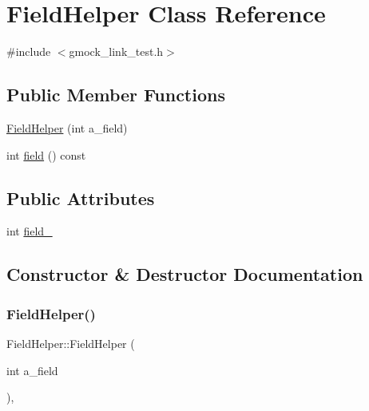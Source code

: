 \hypertarget{class_field_helper}{}\section{Field\+Helper Class Reference}
\label{class_field_helper}


{\ttfamily \#include $<$gmock\+\_\+link\+\_\+test.\+h$>$}

\subsection*{Public Member Functions}
\begin{DoxyCompactItemize}
\item 
\hyperlink{class_field_helper_a06729cbd5da2993e8007cb62f1d00b3a}{Field\+Helper} (int a\+\_\+field)
\item 
int \hyperlink{class_field_helper_af2959e142813205aeeb4d2ad27430ad3}{field} () const
\end{DoxyCompactItemize}
\subsection*{Public Attributes}
\begin{DoxyCompactItemize}
\item 
int \hyperlink{class_field_helper_a50a7ec9efc60377363d5ce8bea1708ac}{field\+\_\+}
\end{DoxyCompactItemize}


\subsection{Constructor \& Destructor Documentation}
\mbox{\label{class_field_helper_a06729cbd5da2993e8007cb62f1d00b3a}} 
\subsubsection{\texorpdfstring{Field\+Helper()}{FieldHelper()}}
{\footnotesize\ttfamily Field\+Helper\+::\+Field\+Helper (\begin{DoxyParamCaption}\item[{int}]{a\+\_\+field }\end{DoxyParamCaption})\hspace{0.3cm}{\ttfamily [inline]}, {\ttfamily [explicit]}}




